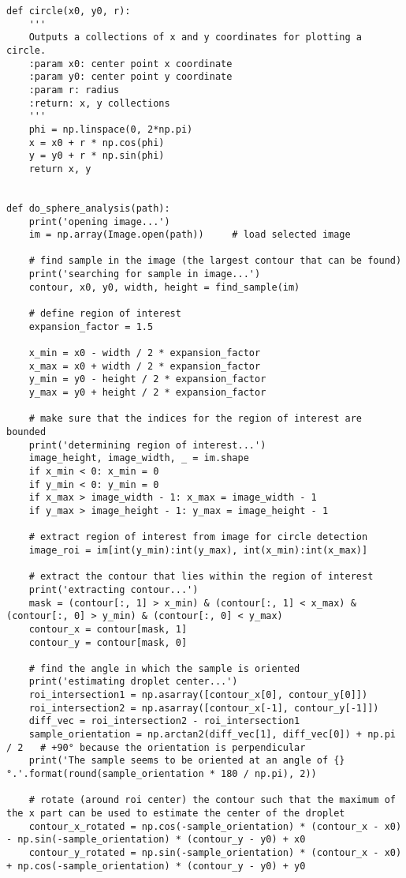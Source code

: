 \begin{lstlisting}
def circle(x0, y0, r):
    '''
    Outputs a collections of x and y coordinates for plotting a circle.
    :param x0: center point x coordinate
    :param y0: center point y coordinate
    :param r: radius
    :return: x, y collections
    '''
    phi = np.linspace(0, 2*np.pi)
    x = x0 + r * np.cos(phi)
    y = y0 + r * np.sin(phi)
    return x, y


def do_sphere_analysis(path):
    print('opening image...')
    im = np.array(Image.open(path))     # load selected image

    # find sample in the image (the largest contour that can be found)
    print('searching for sample in image...')
    contour, x0, y0, width, height = find_sample(im)

    # define region of interest
    expansion_factor = 1.5

    x_min = x0 - width / 2 * expansion_factor
    x_max = x0 + width / 2 * expansion_factor
    y_min = y0 - height / 2 * expansion_factor
    y_max = y0 + height / 2 * expansion_factor

    # make sure that the indices for the region of interest are bounded
    print('determining region of interest...')
    image_height, image_width, _ = im.shape
    if x_min < 0: x_min = 0
    if y_min < 0: y_min = 0
    if x_max > image_width - 1: x_max = image_width - 1
    if y_max > image_height - 1: y_max = image_height - 1

    # extract region of interest from image for circle detection
    image_roi = im[int(y_min):int(y_max), int(x_min):int(x_max)]

    # extract the contour that lies within the region of interest
    print('extracting contour...')
    mask = (contour[:, 1] > x_min) & (contour[:, 1] < x_max) & (contour[:, 0] > y_min) & (contour[:, 0] < y_max)
    contour_x = contour[mask, 1]
    contour_y = contour[mask, 0]

    # find the angle in which the sample is oriented
    print('estimating droplet center...')
    roi_intersection1 = np.asarray([contour_x[0], contour_y[0]])
    roi_intersection2 = np.asarray([contour_x[-1], contour_y[-1]])
    diff_vec = roi_intersection2 - roi_intersection1
    sample_orientation = np.arctan2(diff_vec[1], diff_vec[0]) + np.pi / 2   # +90° because the orientation is perpendicular
    print('The sample seems to be oriented at an angle of {}°.'.format(round(sample_orientation * 180 / np.pi), 2))

    # rotate (around roi center) the contour such that the maximum of the x part can be used to estimate the center of the droplet
    contour_x_rotated = np.cos(-sample_orientation) * (contour_x - x0) - np.sin(-sample_orientation) * (contour_y - y0) + x0
    contour_y_rotated = np.sin(-sample_orientation) * (contour_x - x0) + np.cos(-sample_orientation) * (contour_y - y0) + y0


\end{lstlisting}
